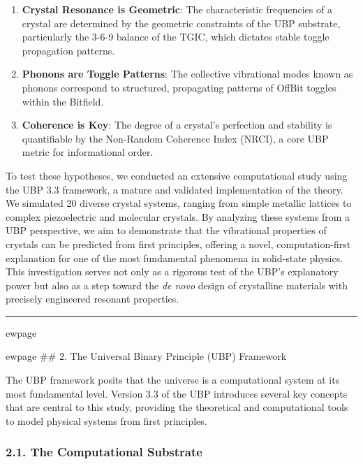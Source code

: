 \begin{enumerate}
\def\labelenumi{\arabic{enumi}.}
\tightlist
\item
  \textbf{Crystal Resonance is Geometric}: The characteristic
  frequencies of a crystal are determined by the geometric constraints
  of the UBP substrate, particularly the 3-6-9 balance of the TGIC,
  which dictates stable toggle propagation patterns.
\item
  \textbf{Phonons are Toggle Patterns}: The collective vibrational modes
  known as phonons correspond to structured, propagating patterns of
  OffBit toggles within the Bitfield.
\item
  \textbf{Coherence is Key}: The degree of a crystal's perfection and
  stability is quantifiable by the Non-Random Coherence Index (NRCI), a
  core UBP metric for informational order.
\end{enumerate}

To test these hypotheses, we conducted an extensive computational study
using the UBP 3.3 framework, a mature and validated implementation of
the theory. We simulated 20 diverse crystal systems, ranging from simple
metallic lattices to complex piezoelectric and molecular crystals. By
analyzing these systems from a UBP perspective, we aim to demonstrate
that the vibrational properties of crystals can be predicted from first
principles, offering a novel, computation-first explanation for one of
the most fundamental phenomena in solid-state physics. This
investigation serves not only as a rigorous test of the UBP's
explanatory power but also as a step toward the \emph{de novo} design of
crystalline materials with precisely engineered resonant properties.

\begin{center}\rule{0.5\linewidth}{0.5pt}\end{center}

ewpage

ewpage \#\# 2. The Universal Binary Principle (UBP) Framework

The UBP framework posits that the universe is a computational system at
its most fundamental level. Version 3.3 of the UBP introduces several
key concepts that are central to this study, providing the theoretical
and computational tools to model physical systems from first principles.

\subsubsection{2.1. The Computational
Substrate}\label{the-computational-substrate}

